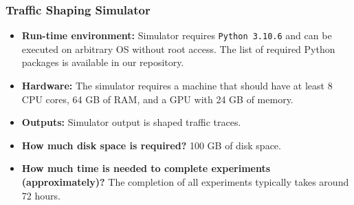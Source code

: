 \subsubsection{Traffic Shaping Simulator}
\label{subsubsec:check-list-simulator}
\begin{itemize}
  \setlength{\itemsep}{1pt}
  \item \textbf{Run-time environment:} Simulator requires \texttt{Python 3.10.6} and can be executed on arbitrary OS without root access. The list of required Python packages is available in our repository. 
  \item \textbf{Hardware:} The simulator requires a machine that should have at least 8 CPU cores, 64 GB of RAM, and a GPU with 24 GB of memory.
  \item \textbf{Outputs:} Simulator output is shaped traffic traces.
  \item \textbf{How much disk space is required?} 100 GB of disk space.
  \item \textbf{How much time is needed to complete experiments (approximately)?} The completion of all experiments typically takes around 72 hours.
\end{itemize}



